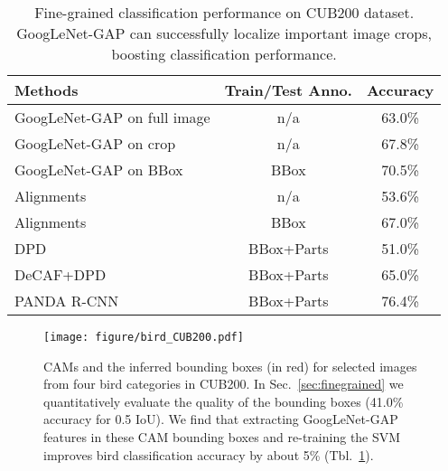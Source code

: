 \documentclass[10pt,twocolumn,letterpaper]{article}
\begin{document}
\begin{table}\caption{Fine-grained classification performance on CUB200 dataset. GoogLeNet-GAP can successfully localize important image crops, boosting classification performance.}
\centering
\footnotesize
\begin{tabular}{ l | c | c }
\hline
  \hline                       
  Methods & Train/Test Anno. & Accuracy \\
    \hline  
    GoogLeNet-GAP on full image & n/a & 63.0\% \\
    GoogLeNet-GAP on crop & n/a & 67.8\% \\
	GoogLeNet-GAP on BBox & BBox & 70.5\% \\
    \hline   
    Alignments \cite{gavves2014local} & n/a & 53.6\% \\
    Alignments \cite{gavves2014local} & BBox & 67.0\%\\
    DPD \cite{zhang2013deformable} & BBox+Parts & 51.0\% \\
    DeCAF+DPD \cite{donahue2014decaf} & BBox+Parts & 65.0\%\\
    PANDA R-CNN \cite{zhang2014part} & BBox+Parts & 76.4\% \\
    \hline  
\end{tabular}\label{birdresult}
\end{table}

\begin{figure}
\begin{center}
\texttt{[image: figure/bird\_CUB200.pdf]}
\end{center}
\caption{CAMs and the inferred bounding boxes (in red) for selected images from four bird categories in CUB200. In Sec.~\ref{sec:finegrained} we quantitatively evaluate the quality of the bounding boxes (41.0\% accuracy for 0.5 IoU). We find that extracting GoogLeNet-GAP features in these CAM bounding boxes and re-training the SVM improves bird classification accuracy by about 5\% (Tbl.~\ref{birdresult}).}
\label{fig:bird}
\end{figure}
\end{document}
